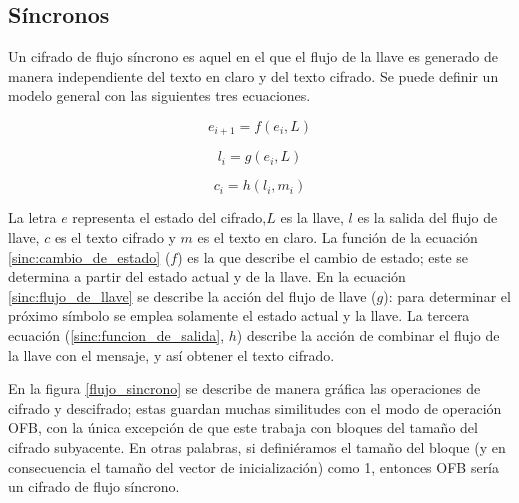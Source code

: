 %
%

\subsection{Síncronos}

Un cifrado de flujo síncrono es aquel en el que el flujo de la llave es
generado de manera independiente del texto en claro y del texto cifrado. Se
puede definir un modelo general con las siguientes tres ecuaciones.

\begin{equation}
  \label{sinc:cambio_de_estado}
  e_{i+1} = f(e_i, L)
\end{equation}

\begin{equation}
  \label{sinc:flujo_de_llave}
  l_i = g(e_i, L)
\end{equation}

\begin{equation}
  \label{sinc:funcion_de_salida}
  c_i = h(l_i, m_i)
\end{equation}

La letra $ e $ representa el estado del cifrado,$ L $ es la llave, $ l $ es
la salida del flujo de llave, $ c $ es el texto cifrado y $ m $ es el texto en
claro. La función de la ecuación \ref{sinc:cambio_de_estado} ($ f $) es la que
describe el cambio de estado; este se determina a partir del estado actual y
de la llave. En la ecuación \ref{sinc:flujo_de_llave} se describe la acción del
flujo de llave ($ g $): para determinar el próximo símbolo se emplea solamente
el estado actual y la llave. La tercera ecuación (\ref{sinc:funcion_de_salida},
$ h $) describe la acción de combinar el flujo de la llave con el mensaje, y
así obtener el texto cifrado.


En la figura \ref{flujo_sincrono} se describe de manera gráfica las operaciones
de cifrado y descifrado; estas guardan muchas similitudes con el modo de
operación OFB, con la única excepción de que este trabaja con bloques del tamaño
del cifrado subyacente. En otras palabras, si definiéramos el tamaño del bloque
(y en consecuencia el tamaño del vector de inicialización) como 1, entonces
OFB sería un cifrado de flujo síncrono.

